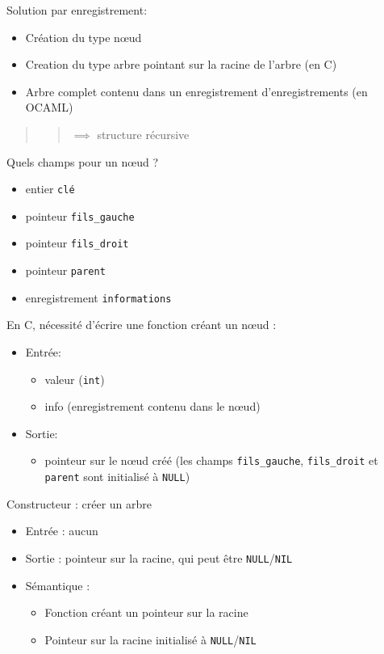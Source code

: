 Solution par enregistrement:

\begin{itemize}
\tightlist
\item
  Création du type nœud
\item
  Creation du type arbre pointant sur la racine de l'arbre (en C)
\item
  Arbre complet contenu dans un enregistrement d'enregistrements (en
  OCAML)
\end{itemize}

\begin{quote}
\begin{quote}
\(\implies\) structure récursive
\end{quote}
\end{quote}

Quels champs pour un nœud ?

\begin{itemize}
\tightlist
\item
  entier \texttt{clé}
\item
  pointeur \texttt{fils\_gauche}
\item
  pointeur \texttt{fils\_droit}
\item
  pointeur \texttt{parent}
\item
  enregistrement \texttt{informations}
\end{itemize}

En C, nécessité d'écrire une fonction créant un nœud :

\begin{itemize}
\tightlist
\item
  Entrée:

  \begin{itemize}
  \tightlist
  \item
    valeur (\texttt{int})
  \item
    info (enregistrement contenu dans le nœud)
  \end{itemize}
\item
  Sortie:

  \begin{itemize}
  \tightlist
  \item
    pointeur sur le nœud créé (les champs \texttt{fils\_gauche},
    \texttt{fils\_droit} et \texttt{parent} sont initialisé à
    \texttt{NULL})
  \end{itemize}
\end{itemize}

Constructeur : créer un arbre

\begin{itemize}
\tightlist
\item
  Entrée : aucun
\item
  Sortie : pointeur sur la racine, qui peut être
  \texttt{NULL}/\texttt{NIL}
\item
  Sémantique :

  \begin{itemize}
  \tightlist
  \item
    Fonction créant un pointeur sur la racine
  \item
    Pointeur sur la racine initialisé à \texttt{NULL}/\texttt{NIL}
  \end{itemize}
\end{itemize}

